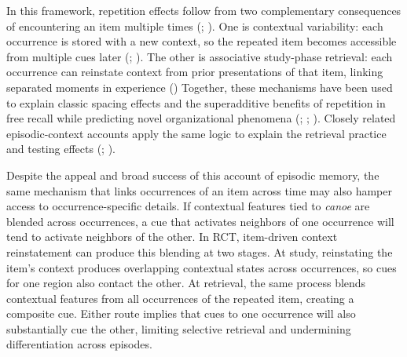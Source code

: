 \documentclass[
  man,
  floatsintext,
  longtable,
  nolmodern,
  notxfonts,
  notimes,
  draftfirst,
  colorlinks=true,linkcolor=blue,citecolor=blue,urlcolor=blue]{apa7}
\begin{document}
In this framework, repetition effects follow from two complementary
consequences of encountering an item multiple times
(;
). One is
contextual variability: each occurrence is stored with a new context, so
the repeated item becomes accessible from multiple cues later
(;
). The other is
associative study-phase retrieval: each occurrence can reinstate context
from prior presentations of that item, linking separated moments in
experience ()
Together, these mechanisms have been used to explain classic spacing
effects and the superadditive benefits of repetition in free recall
while predicting novel organizational phenomena
(;
;
). Closely
related episodic-context accounts apply the same logic to explain the
retrieval practice and testing effects
(;
).

Despite the appeal and broad success of this account of episodic memory,
the same mechanism that links occurrences of an item across time may
also hamper access to occurrence-specific details. If contextual
features tied to \emph{canoe} are blended across occurrences, a cue that
activates neighbors of one occurrence will tend to activate neighbors of
the other. In RCT, item-driven context reinstatement can produce this
blending at two stages. At study, reinstating the item's context
produces overlapping contextual states across occurrences, so cues for
one region also contact the other. At retrieval, the same process blends
contextual features from all occurrences of the repeated item, creating
a composite cue. Either route implies that cues to one occurrence will
also substantially cue the other, limiting selective retrieval and
undermining differentiation across episodes.
\end{document}
